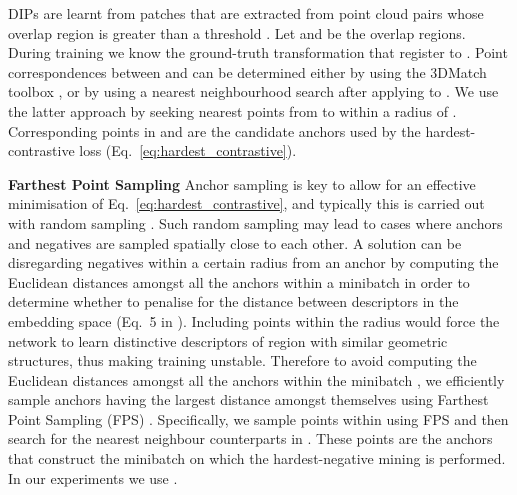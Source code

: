 \documentclass[a4paper,conference]{IEEEtran}
\begin{document}
DIPs are learnt from patches that are extracted from point cloud pairs  whose overlap region is greater than a threshold .
Let  and  be the overlap regions.
During training we know the ground-truth transformation  that register  to .
Point correspondences between  and  can be determined either by using the 3DMatch toolbox \cite{Zeng2017}, or by using a nearest neighbourhood search after applying  to  \cite{Gojcic2019}.
We use the latter approach by seeking nearest points from  to  within a radius of .
Corresponding points in  and  are the candidate anchors used by the hardest-contrastive loss (Eq.~\ref{eq:hardest_contrastive}).

\vspace{.1cm}
\noindent \textbf{Farthest Point Sampling} 
Anchor sampling is key to allow for an effective minimisation of Eq.~\ref{eq:hardest_contrastive}, and typically this is carried out with random sampling \cite{Gojcic2019,Choy2019}.
Such random sampling may lead to cases where anchors and negatives are sampled spatially close to each other.
A solution can be disregarding negatives within a certain radius from an anchor by computing the Euclidean distances amongst all the anchors within a minibatch in order to determine whether to penalise for the distance between descriptors in the embedding space (Eq.~5 in \cite{Choy2019}).
Including points within the radius would force the network to learn distinctive descriptors of region with similar geometric structures, thus making training unstable.
Therefore to avoid computing the Euclidean distances amongst all the anchors within the minibatch \cite{Choy2019,Gojcic2019}, we efficiently sample anchors having the largest distance amongst themselves using Farthest Point Sampling (FPS) \cite{Qi2017b}.
Specifically, we sample  points within  using FPS and then search for the nearest neighbour counterparts in .
These points are the anchors that construct the minibatch on which the hardest-negative mining is performed.
In our experiments we use .
\end{document}
